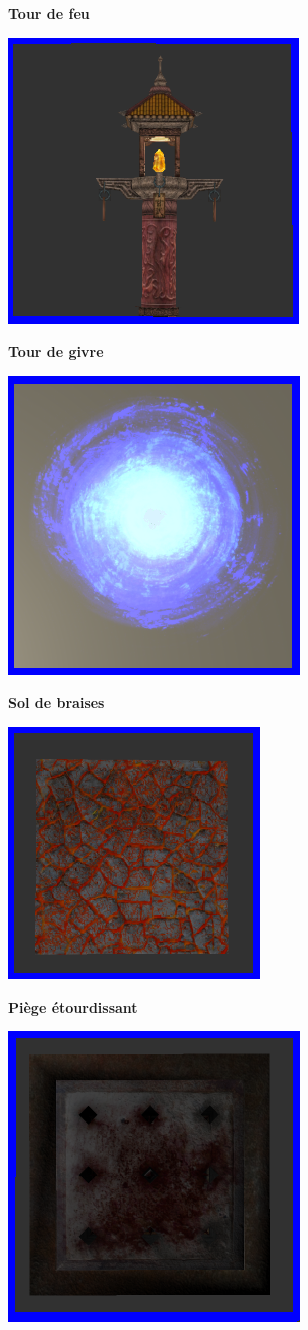 \documentclass[a4paper, 12pt]{article}
\begin{document}
\large \textbf{Tour de feu}
\smallbreak
\centerline{\includegraphics{FirTower.png}}
\bigbreak
\newpage

\large \textbf{Tour de givre}
\smallbreak
\centerline{\includegraphics{IconeFrozenTower.png}}
\bigbreak

\large \textbf{Sol de braises}
\smallbreak
\centerline{\includegraphics[scale=1.2]{LavaBrik.png}}
\bigbreak
\newpage

\large \textbf{Pi\`ege \'etourdissant}
\smallbreak
\centerline{\includegraphics{fbx.png}}
\bigbreak

\newpage
\begin{spacing}{1.0}
	\tableofcontents
\end{spacing}
\end{document}
